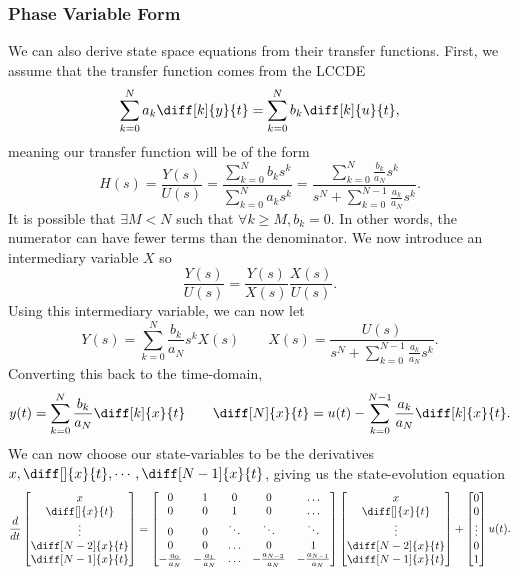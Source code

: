 \subsubsection{Phase Variable Form}
We can also derive state space equations from their transfer functions. First, we assume that the transfer function comes from the LCCDE
\[
  \sum_{k=0}^N a_k \diff[k]{y}{t} = \sum_{k=0}^{N} b_k \diff[k]{u}{t},
\]
meaning our transfer function will be of the form
\[
  H(s) = \frac{Y(s)}{U(s)} = \frac{\sum_{k=0}^N b_k s^k}{\sum_{k=0}^{N}a_k s^k} = \frac{\sum_{k=0}^{N} \frac{b_k}{a_N}s^k}{s^N + \sum_{k=0}^{N-1} \frac{a_k}{a_N}s^k}.
\]
It is possible that $\exists M < N$ such that $\forall k \geq M, b_k=0$. In other words, the numerator can have fewer terms than the denominator.
We now introduce an intermediary variable $X$ so
\[
  \frac{Y(s)}{U(s)} = \frac{Y(s)}{X(s)}\frac{X(s)}{U(s)}.
\]
Using this intermediary variable, we can now let
\[
  Y(s) = \sum_{k=0}^{N} \frac{b_k}{a_N} s^k X(s) \qquad X(s) = \frac{U(s)}{s^N + \sum_{k=0}^{N-1}\frac{a_k}{a_N}s^k}.
\]
Converting this back to the time-domain,
\[
  y(t) = \sum_{k=0}^{N} \frac{b_k}{a_N} \diff[k]{x}{t} \qquad  \diff[N]{x}{t} = u(t) - \sum_{k=0}^{N-1} \frac{a_k}{a_N} \diff[k]{x}{t}.
\]
We can now choose our state-variables to be the derivatives $x, \diff[]{x}{t}, \cdots, \diff[N-1]{x}{t}$, giving us the state-evolution equation
\begin{equation}
  \frac{d}{dt} \begin{bmatrix} x\\\diff[]{x}{t}\\ \vdots \\ \diff[N-2]{x}{t} \\\diff[N-1]{x}{t} \end{bmatrix} = 
  \begin{bmatrix}
	0 & 1 & 0 & 0 & \ldots\\
	0 & 0 & 1 & 0 & \ldots\\
	0 & 0 & \ddots & \ddots & \ddots\\
	0 & 0 & \ldots & 0 & 1\\
	-\frac{a_0}{a_N} & -\frac{a_1}{a_N} & \ldots & -\frac{a_{N-2}}{a_N} & -\frac{a_{N-1}}{a_N}
  \end{bmatrix}
  \begin{bmatrix} x\\\diff[]{x}{t}\\ \vdots \\ \diff[N-2]{x}{t} \\\diff[N-1]{x}{t} \end{bmatrix} 
  + \begin{bmatrix} 0 \\ 0 \\ \vdots \\ 0 \\ 1 \end{bmatrix} u(t).
  \label{eqn:phase-var-1}
\end{equation}
